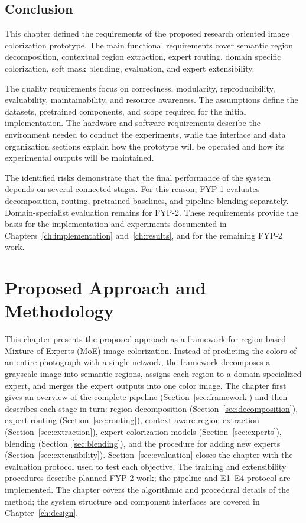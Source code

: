 \documentclass{FastFyp}
\begin{document}
\section{Conclusion}

This chapter defined the requirements of the proposed research oriented image colorization prototype. The main functional requirements cover semantic region decomposition, contextual region extraction, expert routing, domain specific colorization, soft mask blending, evaluation, and expert extensibility.

The quality requirements focus on correctness, modularity, reproducibility, evaluability, maintainability, and resource awareness. The assumptions define the datasets, pretrained components, and scope required for the initial implementation. The hardware and software requirements describe the environment needed to conduct the experiments, while the interface and data organization sections explain how the prototype will be operated and how its experimental outputs will be maintained.

The identified risks demonstrate that the final performance of the system depends on several connected stages. For this reason, FYP-1 evaluates decomposition, routing, pretrained baselines, and pipeline blending separately. Domain-specialist evaluation remains for FYP-2. These requirements provide the basis for the implementation and experiments documented in Chapters~\ref{ch:implementation} and~\ref{ch:results}, and for the remaining FYP-2 work.

\chapter{Proposed Approach and Methodology}
\label{ch:method}

This chapter presents the proposed approach as a framework for region-based Mixture-of-Experts (MoE) image colorization. Instead of predicting the colors of an entire photograph with a single network, the framework decomposes a grayscale image into semantic regions, assigns each region to a domain-specialized expert, and merges the expert outputs into one color image. The chapter first gives an overview of the complete pipeline (Section~\ref{sec:framework}) and then describes each stage in turn: region decomposition (Section~\ref{sec:decomposition}), expert routing (Section~\ref{sec:routing}), context-aware region extraction (Section~\ref{sec:extraction}), expert colorization models (Section~\ref{sec:experts}), blending (Section~\ref{sec:blending}), and the procedure for adding new experts (Section~\ref{sec:extensibility}). Section~\ref{sec:evaluation} closes the chapter with the evaluation protocol used to test each objective. The training and extensibility procedures describe planned FYP-2 work; the pipeline and E1--E4 protocol are implemented. The chapter covers the algorithmic and procedural details of the method; the system structure and component interfaces are covered in Chapter~\ref{ch:design}.
\end{document}
